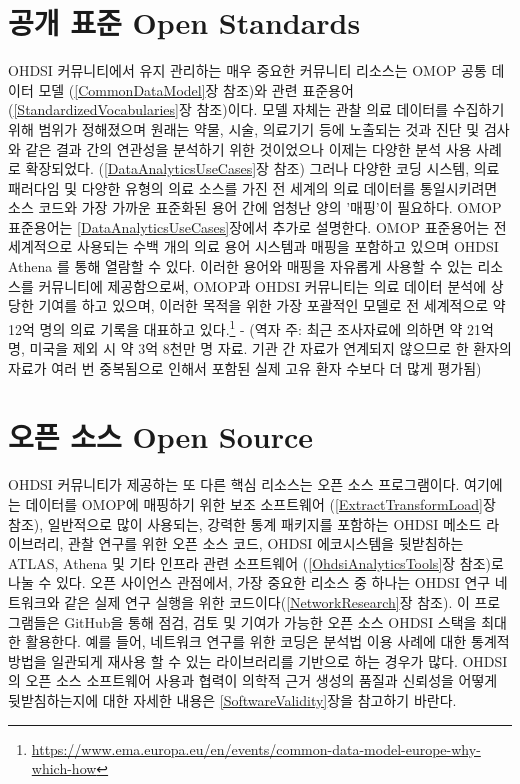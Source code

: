 \documentclass[10.5pt]{book}
\let\rmarkdownfootnote\footnote%
\def\footnote{\protect\rmarkdownfootnote}
\theoremstyle{definition}
\theoremstyle{definition}
\theoremstyle{definition}
\theoremstyle{remark}
\begin{document}
\section{공개 표준 Open Standards}\label{--open-standards}


OHDSI 커뮤니티에서 유지 관리하는 매우 중요한 커뮤니티 리소스는 OMOP 공통
데이터 모델 (\ref{CommonDataModel}장 참조)와 관련 표준용어
(\ref{StandardizedVocabularies}장 참조)이다. 모델 자체는 관찰 의료
데이터를 수집하기 위해 범위가 정해졌으며 원래는 약물, 시술, 의료기기
등에 노출되는 것과 진단 및 검사와 같은 결과 간의 연관성을 분석하기 위한
것이었으나 이제는 다양한 분석 사용 사례로 확장되었다.
(\ref{DataAnalyticsUseCases}장 참조) 그러나 다양한 코딩 시스템, 의료
패러다임 및 다양한 유형의 의료 소스를 가진 전 세계의 의료 데이터를
통일시키려면 소스 코드와 가장 가까운 표준화된 용어 간에 엄청난 양의
'매핑'이 필요하다. OMOP 표준용어는 \ref{DataAnalyticsUseCases}장에서
추가로 설명한다. OMOP 표준용어는 전 세계적으로 사용되는 수백 개의 의료
용어 시스템과 매핑을 포함하고 있으며 OHDSI Athena 를 통해 열람할 수
있다. 이러한 용어와 매핑을 자유롭게 사용할 수 있는 리소스를 커뮤니티에
제공함으로써, OMOP과 OHDSI 커뮤니티는 의료 데이터 분석에 상당한 기여를
하고 있으며, 이러한 목적을 위한 가장 포괄적인 모델로 전 세계적으로 약
12억 명의 의료 기록을 대표하고 있다.\footnote{\url{https://www.ema.europa.eu/en/events/common-data-model-europe-why-which-how}}
\citep{garza_2016} - (역자 주: 최근 조사자료에 의하면 약 21억 명, 미국을
제외 시 약 3억 8천만 명 자료. 기관 간 자료가 연계되지 않으므로 한 환자의
자료가 여러 번 중복됨으로 인해서 포함된 실제 고유 환자 수보다 더 많게
평가됨)

\section{오픈 소스 Open Source}\label{--open-source}


OHDSI 커뮤니티가 제공하는 또 다른 핵심 리소스는 오픈 소스 프로그램이다.
여기에는 데이터를 OMOP에 매핑하기 위한 보조 소프트웨어
(\ref{ExtractTransformLoad}장 참조), 일반적으로 많이 사용되는, 강력한
통계 패키지를 포함하는 OHDSI 메소드 라이브러리, 관찰 연구를 위한 오픈
소스 코드, OHDSI 에코시스템을 뒷받침하는 ATLAS, Athena 및 기타 인프라
관련 소프트웨어 (\ref{OhdsiAnalyticsTools}장 참조)로 나눌 수 있다. 오픈
사이언스 관점에서, 가장 중요한 리소스 중 하나는 OHDSI 연구 네트워크와
같은 실제 연구 실행을 위한 코드이다(\ref{NetworkResearch}장 참조). 이
프로그램들은 GitHub을 통해 점검, 검토 및 기여가 가능한 오픈 소스 OHDSI
스택을 최대한 활용한다. 예를 들어, 네트워크 연구를 위한 코딩은 분석법
이용 사례에 대한 통계적 방법을 일관되게 재사용 할 수 있는 라이브러리를
기반으로 하는 경우가 많다. OHDSI의 오픈 소스 소프트웨어 사용과 협력이
의학적 근거 생성의 품질과 신뢰성을 어떻게 뒷받침하는지에 대한 자세한
내용은 \ref{SoftwareValidity}장을 참고하기 바란다.
\end{document}
